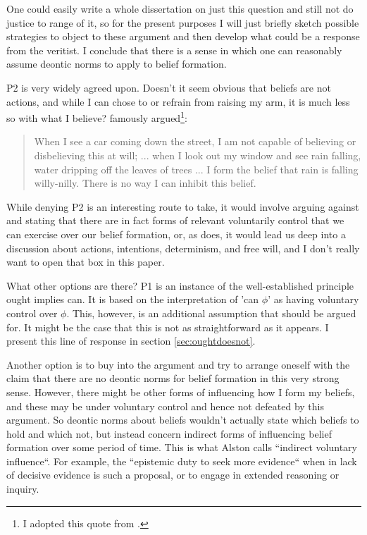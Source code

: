 \documentclass[12pt,numbers=noenddot]{scrartcl}
\begin{document}
One could easily write a whole dissertation on just this question and still not do justice to range of it, so for the present purposes I will just briefly sketch possible strategies to object to these argument and then develop what could be a response from the veritist. I conclude that there is a sense in which one can reasonably assume deontic norms to apply to belief formation.

P2 is very widely agreed upon. Doesn't it seem obvious that beliefs are not actions, and while I can chose to or refrain from raising my arm, it is much less so with what I believe? \textcite[91]{Alston1989} famously argued\footnote{I adopted this quote from \textcite{Steup2000-STEDVA}.}:

\begin{quote}
    When I see a car coming down the street, I am not capable of believing or disbelieving this at will; ... when I look out my window and see rain falling, water dripping off the leaves of trees ... I form the belief that rain is falling willy-nilly. There is no way I can inhibit this belief.
\end{quote}

While denying P2 is an interesting route to take, it would involve arguing against \textcite{Alston1988-ALSTDC} and stating that there are in fact forms of relevant voluntarily control that we can exercise over our belief formation, or, as \textcite{Steup2000-STEDVA} does, it would lead us deep into a discussion about actions, intentions, determinism, and free will, and I don't really want to open that box in this paper. 

What other options are there? P1 is an instance of the well-established principle ought implies can. It is based on the interpretation of 'can $\phi$' as having voluntary control over $\phi$. This, however, is an additional assumption that should be argued for. It might be the case that this is not as straightforward as it appears. I present this line of response in section \ref{sec:oughtdoesnot}.

Another option is to buy into the argument and try to arrange oneself with the claim that there are no deontic norms for belief formation in this very strong sense. However, there might be other forms of influencing how I form my beliefs, and these may be under voluntary control and hence not defeated by this argument. So deontic norms about beliefs wouldn't actually state which beliefs to hold and which not, but instead concern indirect forms of influencing belief formation over some period of time. This is what Alston calls “indirect voluntary influence“. For example, the “epistemic duty to seek more evidence“ \textcite{Hall1998-HALTED-2} when in lack of decisive evidence is such a proposal, or to engage in extended reasoning or inquiry.
\end{document}
